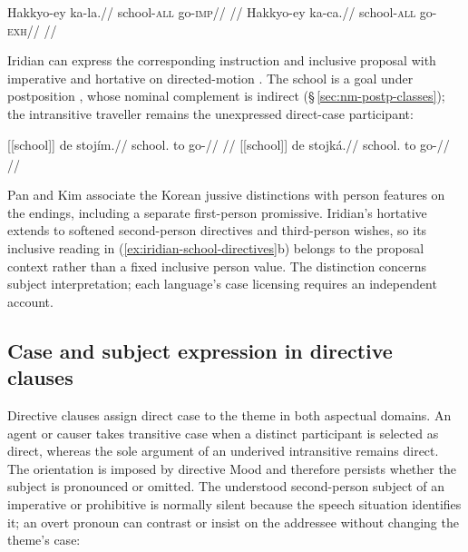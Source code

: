 \pex\label{ex:korean-jussive-comparison}
\a
\begingl
\gla Hakkyo-ey ka-la.//
\glb school-\textsc{all} go-\textsc{imp}//
\glft {} //
\endgl
\a
\begingl
\gla Hakkyo-ey ka-ca.//
\glb school-\textsc{all} go-\textsc{exh}//
\glft {} //
\endgl
\xe

Iridian can express the corresponding instruction and inclusive proposal
with imperative  and hortative  on directed-motion
. The school is a goal
under postposition , whose nominal complement is indirect
(§\,\ref{sec:nm-postp-classes}); the intransitive traveller remains the
unexpressed direct-case participant:

\pex\label{ex:iridian-school-directives}
\a
\begingl
\gla \textnormal{[[school]]}\textsubscript{\Ind{}} de stojím.//
\glb school.\Ind{} to go-\Imp{}//
\glft {} //
\endgl
\a
\begingl
\gla \textnormal{[[school]]}\textsubscript{\Ind{}} de stojká.//
\glb school.\Ind{} to go-\Hort{}//
\glft {} //
\endgl
\xe

Pan and Kim associate the Korean jussive distinctions with person features
on the endings, including a separate first-person promissive. Iridian's
hortative extends to softened second-person directives and third-person
wishes, so its inclusive reading in (\ref{ex:iridian-school-directives}b)
belongs to the proposal context rather than a fixed inclusive person value.
The distinction concerns subject interpretation; each language's case
licensing requires an independent account.

\subsection{Case and subject expression in directive clauses}\label{sec:mood-directive-case}

Directive clauses assign direct case to the theme in both aspectual domains.
An agent or causer takes transitive case when a distinct participant is selected
as direct, whereas the sole argument of an underived intransitive remains
direct. The orientation is imposed by directive Mood and therefore persists
whether the subject is pronounced or omitted. The understood second-person
subject of an imperative or prohibitive is normally silent because the speech
situation identifies it; an overt pronoun can contrast or insist on the
addressee without changing the theme's case:

